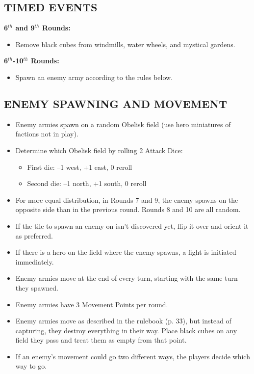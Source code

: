 \begin{multicols*}{2}
\subsection*{\MakeUppercase{Timed Events}}

\textbf{6$^{th}$ and 9$^{th}$ Rounds:}
\begin{itemize}
  \item Remove black cubes from windmills, water wheels, and mystical gardens.
\end{itemize}

\textbf{6$^{th}$-10$^{th}$ Rounds:}
\begin{itemize}
  \item Spawn an enemy army according to the rules below.
\end{itemize}

\end{multicols*}

\newpage

\subsection*{\MakeUppercase{Enemy Spawning and Movement}}

\begin{itemize}
  \item Enemy armies spawn on a random Obelisk field (use hero miniatures of factions not in play).
  \item Determine which Obelisk field by rolling 2 Attack Dice:
  \begin{itemize}
    \item First die: --1 west, +1 east, 0 reroll
    \item Second die: --1 north, +1 south, 0 reroll
  \end{itemize}
  \item For more equal distribution, in Rounds 7 and 9, the enemy spawns on the opposite side than in the previous round.
    Rounds 8 and 10 are all random.
  \item If the tile to spawn an enemy on isn't discovered yet, flip it over and orient it as preferred.
  \item If there is a hero on the field where the enemy spawns, a fight is initiated immediately.
  \item Enemy armies move at the end of every turn, starting with the same turn they spawned.
  \item Enemy armies have 3 Movement Points per round.
  \item Enemy armies move as described in the rulebook (p. 33), but instead of capturing, they destroy everything in their way.
    Place black cubes on any field they pass and treat them as empty from that point.
  \item If an enemy's movement could go two different ways, the players decide which way to go.
\end{itemize}


